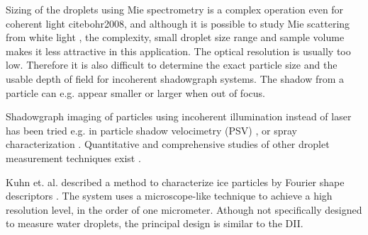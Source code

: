 Sizing of the droplets using Mie spectrometry is a complex operation even for coherent light cite{bohr2008}, and although it is possible to study Mie scattering from white light \cite{ward2008}, the complexity, small droplet size range and sample volume makes it less attractive in this application. The optical resolution is usually too low. Therefore it is also difficult to determine the exact particle size and the usable depth of field for incoherent shadowgraph systems. The shadow from a particle can e.g. appear smaller or larger when out of focus.

Shadowgraph imaging of particles using incoherent illumination instead of laser has been tried e.g. in particle shadow velocimetry (PSV) \cite{este2005}, or spray characterization \cite{will2010}. Quantitative and comprehensive studies of other droplet measurement techniques exist \cite{dye1984,henn2013,conno2007}.

Kuhn et. al. \cite{kuhn2012} described a method to characterize ice particles by Fourier shape descriptors \cite{gran1972,walla1980}. The system uses a microscope-like technique to achieve a high resolution level, in the order of one micrometer. Athough not specifically designed to measure water droplets, the principal design is similar to the DII. 



